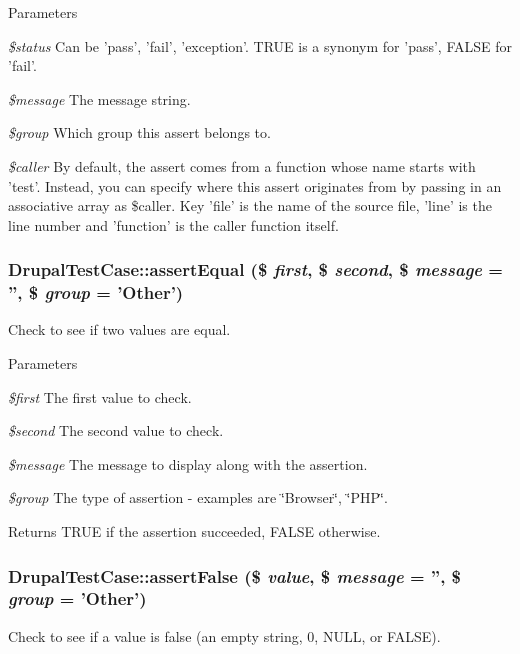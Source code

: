 \begin{DoxyParams}{Parameters}
\item[{\em \$status}]Can be 'pass', 'fail', 'exception'. TRUE is a synonym for 'pass', FALSE for 'fail'. \item[{\em \$message}]The message string. \item[{\em \$group}]Which group this assert belongs to. \item[{\em \$caller}]By default, the assert comes from a function whose name starts with 'test'. Instead, you can specify where this assert originates from by passing in an associative array as \$caller. Key 'file' is the name of the source file, 'line' is the line number and 'function' is the caller function itself. \end{DoxyParams}
\hypertarget{classDrupalTestCase_ab55dd157dcaed13231e0071a9f114878}{
\subsubsection[{assertEqual}]{\setlength{\rightskip}{0pt plus 5cm}DrupalTestCase::assertEqual (\$ {\em first}, \/  \$ {\em second}, \/  \$ {\em message} = {\ttfamily ''}, \/  \$ {\em group} = {\ttfamily 'Other'})}}
\label{classDrupalTestCase_ab55dd157dcaed13231e0071a9f114878}
Check to see if two values are equal.


\begin{DoxyParams}{Parameters}
\item[{\em \$first}]The first value to check. \item[{\em \$second}]The second value to check. \item[{\em \$message}]The message to display along with the assertion. \item[{\em \$group}]The type of assertion -\/ examples are \char`\"{}Browser\char`\"{}, \char`\"{}PHP\char`\"{}. \end{DoxyParams}
\begin{DoxyReturn}{Returns}
TRUE if the assertion succeeded, FALSE otherwise. 
\end{DoxyReturn}
\hypertarget{classDrupalTestCase_a8dbe449ccfc164f64d07a42337e51747}{
\subsubsection[{assertFalse}]{\setlength{\rightskip}{0pt plus 5cm}DrupalTestCase::assertFalse (\$ {\em value}, \/  \$ {\em message} = {\ttfamily ''}, \/  \$ {\em group} = {\ttfamily 'Other'})}}
\label{classDrupalTestCase_a8dbe449ccfc164f64d07a42337e51747}
Check to see if a value is false (an empty string, 0, NULL, or FALSE).


